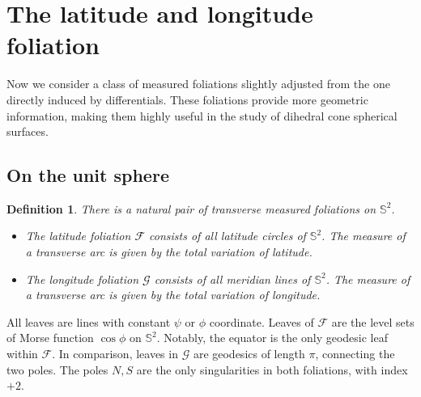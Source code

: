 \documentclass[pdflatex,sn-mathphys]{sn-jnl}%
\numberwithin{equation}{section}
\theoremstyle{thmstyleone}%
\newtheorem{definition}[theorem]{Definition}
\newcommand{\STwo}{\mathbb{S}^2}
\newcommand{\mfoli}{measured foliation}
\newcommand{\csphsf}{cone spherical surface}
\newcommand{\SYM}{\textcolor{black}}
\newcommand{\DEF}{\emph}
\begin{document}
\section{The latitude and longitude foliation}\label{sec:LLfoli}
Now we consider a class of \mfoli s slightly adjusted from the one directly induced by differentials. These foliations provide more geometric information, making them highly useful in the study of dihedral \csphsf s.

\subsection{On the unit sphere}\label{sec:foli_sphere}
\newcommand{\latifoli}{latitude foliation}
\newcommand{\longfoli}{longitude foliation}
\newcommand{\FoliLati}{\mathcal{F}}
\newcommand{\FoliLogi}{\mathcal{G}}
\begin{definition}\label{def:LL_foli_sphere}
    There is a natural pair of transverse measured foliations on $\STwo$.
    \begin{itemize}
        \item The \DEF{latitude foliation} \SYM{$\mathcal{F}$} consists of all latitude circles of $\STwo$. The measure of a transverse arc is given by the total variation of latitude.
        \item The \DEF{longitude foliation} \SYM{$\mathcal{G}$} consists of all meridian lines of $\STwo$. The measure of a transverse arc is given by the total variation of longitude.
    \end{itemize}
\end{definition}
All leaves are lines with constant $\psi$ or $\phi$ coordinate. Leaves of $\FoliLati$ are the level sets of Morse function $\cos\phi$ on $\STwo$. Notably, the equator is the only geodesic leaf within $\FoliLati$. In comparison, leaves in $\FoliLogi$ are geodesics of length $\pi$, connecting the two poles. The poles $N,S$ are the only singularities in both foliations, with index $+2$.
\end{document}
